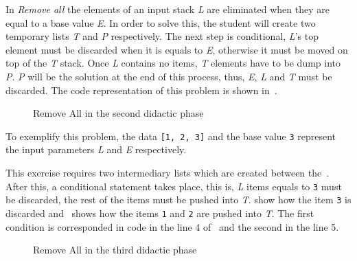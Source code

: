 In \emph{Remove all} the elements of an input stack \emph{L} are
eliminated when they are equal to a base value \emph{E}. In order to
solve this, the student will create two temporary lists \emph{T} and
\emph{P} respectively. The next step is conditional, \emph{L}'s top
element must be discarded when it is equals to \emph{E}, otherwise
it must be moved on top of the \emph{T} stack. Once \emph{L} contains
no items, \emph{T} elements have to be dump into \emph{P}. \emph{P}
will be the solution at the end of this process, thus, \emph{E},
\emph{L} and \emph{T} must be discarded. The \erlang code
representation of this problem is shown in~.

\begin{figure}[h!]
  \centering
  \caption{Remove All in the second didactic phase}
  \label{fig:remall:p2}
\end{figure}

To exemplify this problem, the data \texttt{[1, 2, 3]} and the base
value \texttt{3} represent the input parameters \emph{L} and
\emph{E} respectively.

This exercise requires two intermediary lists
which are created between the~. After
this, a conditional statement takes place, this is, \emph{L} items
equals to \texttt{3} must be discarded, the rest of the items must be
pushed into \emph{T}.  show how the
item \texttt{3} is discarded and~ shows how the
items \texttt{1} and \texttt{2} are pushed into \emph{T}. The first
condition is corresponded in \erlang code in the line 4
of~ and the second in the line 5.

\begin{figure}[h!]
  \centering
  \caption{Remove All in the third didactic phase}
  \label{fig:remall:p3}
\end{figure}

